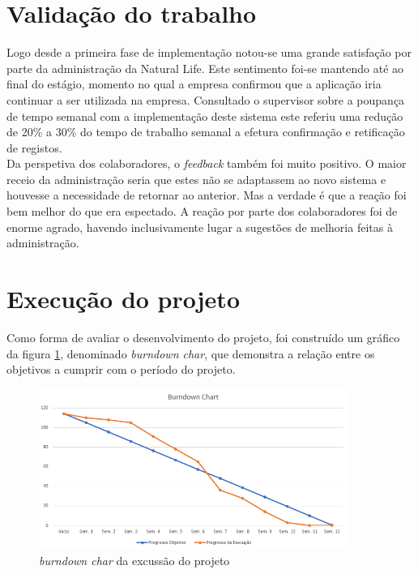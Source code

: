 \section{Validação do trabalho}
Logo desde a primeira fase de implementação notou-se uma grande satisfação por parte da administração da Natural Life. Este sentimento foi-se mantendo até ao final do estágio, momento no qual a empresa confirmou que a aplicação iria continuar a ser utilizada na empresa. Consultado o supervisor sobre a poupança de tempo semanal com a implementação deste sistema este referiu uma redução de 20\% a 30\% do tempo de trabalho semanal a efetura confirmação e retificação de registos.\\
Da perspetiva dos colaboradores, o \textit{feedback} também foi muito positivo. O maior receio da administração seria que estes não se adaptassem ao novo sistema e houvesse a necessidade de retornar ao anterior. Mas a verdade é que a reação foi bem melhor do que era espectado. A reação por parte dos colaboradores foi de enorme agrado, havendo inclusivamente lugar a sugestões de melhoria feitas à administração.
\newpage
\section{Execução do projeto} 
Como forma de avaliar o desenvolvimento do projeto, foi construído um gráfico da figura \ref{fig:burndown_chart}, denominado \textit{burndown char}, que demonstra a relação entre os objetivos a cumprir com o período do projeto.

\begin{figure}[H] 
	\begin{center}
		\includegraphics[width=0.90\textwidth,keepaspectratio]{figuras/burndown_chart.png}
		\caption{\textit{burndown char} da excussão do projeto}
		\label{fig:burndown_chart} 
	\end{center}
\end{figure}

